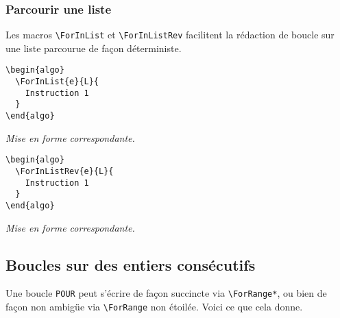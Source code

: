 \documentclass[12pt,a4paper]{article}
\theoremstyle{definition}
\newenvironment{frame-gene}[1][]{
	\begin{tcolorbox}[
		title        = #1, 
		colbacktitle = black!10!white, 
		colback      = white, 
		coltitle     = black,
		fonttitle    = \bfseries\itshape\small, 
		breakable,
		center title]
}{
	\end{tcolorbox}
}
\begin{document}
\subsubsection{Parcourir une liste}

Les macros \verb+\ForInList+ et \verb+\ForInListRev+ facilitent la rédaction de boucle sur une liste parcourue de façon déterministe.


\begin{multicols}{2}
\centering
\begin{frame-gene}
\begin{verbatim}
\begin{algo}
  \ForInList{e}{L}{
    Instruction 1
  }
\end{algo}
\end{verbatim}
\end{frame-gene}
\vfill\null
\columnbreak
\textit{Mise en forme correspondante.}
\begin{algo}
\end{algo}
\vfill\null
\end{multicols}


\begin{multicols}{2}
\centering
\begin{frame-gene}
\begin{verbatim}
\begin{algo}
  \ForInListRev{e}{L}{
    Instruction 1
  }
\end{algo}
\end{verbatim}
\end{frame-gene}
\vfill\null
\columnbreak
\textit{Mise en forme correspondante.}
\begin{algo}
\end{algo}
\vfill\null
\end{multicols}





\subsection{Boucles sur des entiers consécutifs}

Une boucle \verb+POUR+ peut s'écrire de façon succincte via \verb+\ForRange*+, ou bien de façon non ambigüe via \verb+\ForRange+ non étoilée. Voici ce que cela donne.
\end{document}
